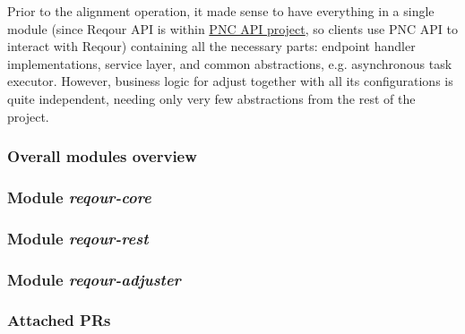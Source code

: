 \documentclass[../main.tex]{subfiles}
\begin{document}
Prior to the alignment operation, it made sense to have everything in a single module (since Reqour API is within \href{https://github.com/project-ncl/pnc-api}{PNC API project}, so clients use PNC API to interact with Reqour) containing all the necessary parts: endpoint handler implementations, service layer, and common abstractions, e.g. asynchronous task executor. However, business logic for adjust together with all its configurations is quite independent, needing only very few abstractions from the rest of the project.

\subsubsection*{Overall modules overview}


\subsubsection*{Module \textit{reqour-core}}


\subsubsection*{Module \textit{reqour-rest}}


\subsubsection*{Module \textit{reqour-adjuster}}


\subsubsection*{Attached PRs}

\end{document}
